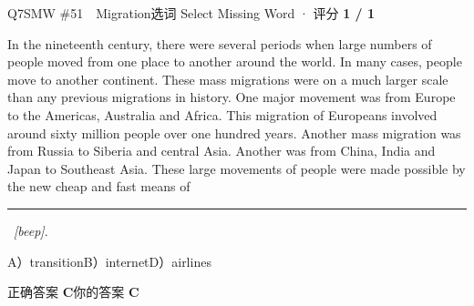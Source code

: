 \begin{qblock}{Q7\quad SMW \#51\ \ Migration}{选词 Select Missing Word · 评分 \textcolor{cAccent}{\bfseries 1 / 1}}
\begin{promptbox}
In the nineteenth century, there were several periods when large numbers of people moved from one place to another around the world. In many cases, people move to another continent. These mass migrations were on a much larger scale than any previous migrations in history. One major movement was from Europe to the Americas, Australia and Africa. This migration of Europeans involved around sixty million people over one hundred years. Another mass migration was from Russia to Siberia and central Asia. Another was from China, India and Japan to Southeast Asia. These large movements of people were made possible by the new cheap and fast means of \rule{1.2cm}{0.4pt}\ \textit{[beep]}.
\end{promptbox}
{\small A）transition\quad B）internet\quad D）airlines}
\smallskip\par
{\small 正确答案 \textcolor{cFix}{\bfseries C}\qquad 你的答案 \textcolor{cFix}{\bfseries C}}
\end{qblock}


